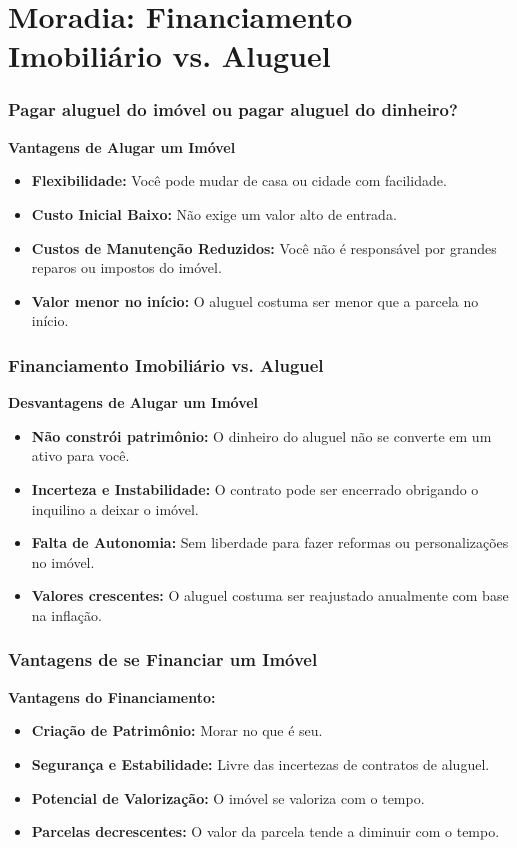 \section{Moradia: Financiamento Imobiliário vs. Aluguel}

\begin{frame}[c]\frametitle{Pagar aluguel do imóvel ou pagar aluguel do dinheiro?}
  \textbf{Vantagens de Alugar um Imóvel}
  \begin{itemize}
    \item \textbf{Flexibilidade:} Você pode mudar de casa ou cidade com facilidade.
    \item \textbf{Custo Inicial Baixo:} Não exige um valor alto de entrada.
    \item \textbf{Custos de Manutenção Reduzidos:} Você não é responsável por grandes reparos ou impostos do imóvel.
    \item \textbf{Valor menor no início:} O aluguel costuma ser menor que a parcela no início.
  \end{itemize}
\end{frame}

\begin{frame}[c]\frametitle{Financiamento Imobiliário vs. Aluguel}
  \textbf{Desvantagens de Alugar um Imóvel}
  \begin{itemize}
    \item \textbf{Não constrói patrimônio:} O dinheiro do aluguel não se converte em um ativo para você.
    \item \textbf{Incerteza e Instabilidade:} O contrato pode ser encerrado obrigando o inquilino a deixar o imóvel.
    \item \textbf{Falta de Autonomia:} Sem liberdade para fazer reformas ou personalizações no imóvel.
    \item \textbf{Valores crescentes:} O aluguel costuma ser reajustado anualmente com base na inflação.
  \end{itemize}
\end{frame}

\begin{frame}[c]\frametitle{Vantagens de se Financiar um Imóvel}
  \textbf{Vantagens do Financiamento:}
  \begin{itemize}
    \item \textbf{Criação de  Patrimônio:} Morar no que é seu.
    \item \textbf{Segurança e Estabilidade:} Livre das incertezas de contratos de aluguel.
    \item \textbf{Potencial de Valorização:} O imóvel se valoriza com o tempo.
    \item \textbf{Parcelas decrescentes:} O valor da parcela tende a diminuir com o tempo.
  \end{itemize}
\end{frame}


